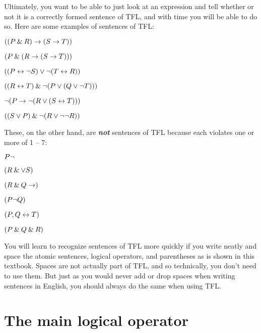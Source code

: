 Ultimately, you want to be able to just look at an expression and tell whether or not it is a correctly formed sentence of TFL, and with time you will be able to do so. Here are some examples of sentences of TFL:
\begin{earg}
\item $((P \mathbin{\&} R) \rightarrow (S \rightarrow T))$
\item $(P \mathbin{\&} (R \rightarrow (S \rightarrow T)))$
\item $((P \leftrightarrow {\neg} S) \vee {\neg}(T \leftrightarrow R))$
\item $((R \leftrightarrow T) \mathbin{\&} {\neg}(P \vee (Q \vee {\neg} T)))$
\item ${\neg}(P \rightarrow {\neg}(R \vee (S \leftrightarrow T)))$
\item $((S \vee P) \mathbin{\&} {\neg}(R \vee {\neg}{\neg} R))$
\end{earg}
These, on the other hand, are \textit{\textbf{not}} sentences of TFL because each violates one or more of 1 -- 7:
\begin{earg}
\item $P{\neg}$
\item $(R \mathbin{\&} \vee S)$
\item $(R \mathbin{\&} Q \rightarrow)$
\item $(P {\neg} Q)$
\item $(P,Q \leftrightarrow T)$
\item $(P \mathbin{\&} Q \mathbin{\&} R)$
\end{earg}

You will learn to recognize sentences of TFL more quickly if you write neatly and space the atomic sentences, logical operators, and parentheses as is shown in this textbook. Spaces are not actually part of TFL, and so technically, you don't need to use them. But just as you would never add or drop spaces when writing sentences in English, you should always do the same when using TFL.



\section{The main logical operator}
\label{main_logical_operator}

